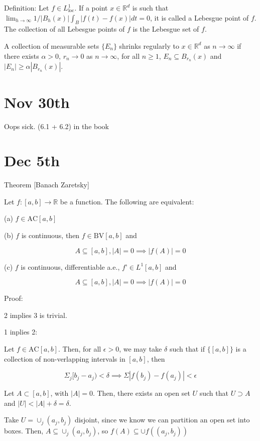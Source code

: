 \documentclass[10pt]{article}
\newcommand{\bv}{{\text{BV}}}
\newcommand{\ac}{\text{AC}}
\begin{document}
Definition: Let $f \in L^1_{\text{loc}}$. If a point $x \in \mathbb{R}^d$ is such that $\lim_{h \to \infty} 1/|B_h(x)| \int_B |f(t) - f(x)|dt = 0$, it is called a Lebesgue
point of $f$. The collection of all Lebesgue points of $f$ is the Lebesgue set of $f$.

A collection of measurable sets $\{ E_n \}$ shrinks regularly to $x \in \mathbb{R}^d$ as $n \to \infty$ if there exists $\alpha > 0$, $r_n \to 0$ as $n \to \infty$, for all $n \geq 1$, $E_n \subseteq B_{r_n}(x)$ and $|E_n| \geq \alpha | B_{r_n}(x)|$.

\section*{Nov 30th}

Oops sick. (6.1 + 6.2) in the book

\section*{Dec 5th}

Theorem [Banach Zaretsky]

Let $f: [a,b] \to \mathbb{R}$ be a function. The following are equivalent:

(a) $f \in \ac[a,b]$

(b) $f$ is continuous, then $f \in \bv[a,b]$ and

$$ A \subseteq [a,b], |A| = 0 \implies |f(A)| = 0 $$

(c) $f$ is continuous, differentiable a.e., $f’ \in L^1[a,b]$ and

$$ A \subseteq [a,b], |A| = 0 \implies |f(A)| = 0$$

Proof:

2 implies 3 is trivial.

1 inplies 2:

Let $f \in \ac[a,b]$. Then, for all $\epsilon > 0$, we may take $\delta$ such that if $\{ [a,b] \}$ is a collection of non-verlapping intervals in $[a,b]$, then

$$ \Sigma_j [b_j - a_j) < \delta \implies \Sigma | f(b_j) - f(a_j)| < \epsilon$$

Let $A \subset [a,b]$, with $|A| = 0$. Then, there exists an open set $U$ such that $U \supset A$ and $|U| < |A| + \delta = \delta$.

Take $U = \cup_j (a_j,b_j)$ disjoint, since we know we can partition an open set into boxes. Then, $A \subseteq \cup_j (a_j,b_j)$, so $f(A) \subseteq \cup f((a_j,b_j))$
\end{document}
